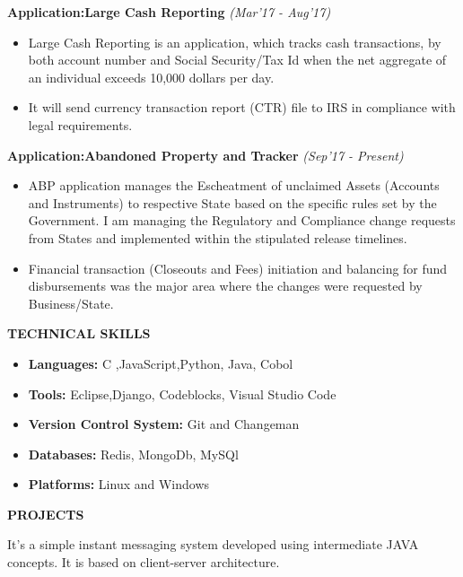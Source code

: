 \documentclass[a4paper,10pt]{article}
\newcommand{\resheading}[1]{{\small \colorbox{mygrey}{\begin{minipage}{0.975\textwidth}{\textbf{#1 \vphantom{p\^{E}}}}\end{minipage} \hspace{0.2cm}}}}
\begin{document}
\indent\small{\textbf{Application:Large Cash Reporting}	\hfill	\small{\textit{(Mar'17 - Aug'17)}}
\begin{itemize}
 \item Large Cash Reporting is an application, which tracks cash transactions, by both account number and Social Security/Tax Id when the net aggregate of an individual exceeds 10,000 dollars per day.
 \item It will send currency transaction report (CTR) file to IRS in compliance with legal requirements.
\end{itemize}

\indent\small{\textbf{Application:Abandoned Property and Tracker}	\hfill	\small{\textit{(Sep'17 - Present)}}
\begin{itemize}
 \item ABP application manages the Escheatment of unclaimed Assets (Accounts and Instruments) to respective State based on the specific rules set by the Government. I am managing the Regulatory and Compliance change requests from States and implemented within the stipulated release timelines.
 \item Financial transaction (Closeouts and Fees) initiation and balancing for fund disbursements was the major area where the changes were requested by Business/State.
\end{itemize}

\resheading{TECHNICAL SKILLS} 
    \begin{itemize}
\item \textbf{Languages:\space} C ,\space JavaScript,\space Python, \space Java, \space Cobol
\item \textbf{Tools:} Eclipse,\space Django\space, Codeblocks\space, Visual Studio Code\space
\item \textbf{Version Control System:} Git and Changeman
\item \textbf{Databases:} Redis, MongoDb, MySQl
\item \textbf{Platforms:} Linux and Windows
    \end{itemize}
    
    
\resheading{PROJECTS}
\begin{itemize}
  \item\indent\small{\textbf{Instant Messenger}	\hfill	\small{\textit{(July'18)}}
  \end{itemize}
  
It's a simple instant messaging system developed using intermediate JAVA concepts. It is based on client-server architecture.

}}
\end{document}

